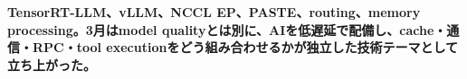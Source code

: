\noindent\textbf{TensorRT-LLM、vLLM、NCCL EP、PASTE、routing、memory processing。3月はmodel qualityとは別に、AIを低遅延で配備し、cache・通信・RPC・tool executionをどう組み合わせるかが独立した技術テーマとして立ち上がった。}\autocite{src-3802d01433c1,src-446e2c561111,src-7e670bf82538,src-d6cda62f02bb,src-fc697f165940}
